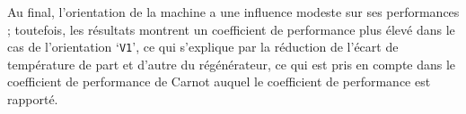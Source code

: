
Au final, l'orientation de la machine a une influence modeste sur ses performances ; toutefois, les résultats montrent un coefficient de performance plus élevé dans le cas de l'orientation `\texttt{V1}', ce qui s'explique par la réduction de l'écart de température de part et d'autre du régénérateur, ce qui est pris en compte dans le coefficient de performance de Carnot auquel le coefficient de performance est rapporté.\bigskip



